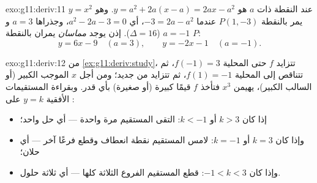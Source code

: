 \begin{solution}{exo:g11:deriv:11}
  $y = x^2$ عند النقطة ذات  $a$ هو
$y = a^2 + 2a(x - a) = 2ax - a^2$. وهو يمر بالنقطة $P(1, -3)$ عندما
$-3 = 2a - a^2$، أي $a^2 - 2a - 3 = 0$، وجذراها $a = 3$ و
$a = -1$ ($\Delta = 16$). إذن يوجد \emph{مماسان} يمران
بالنقطة $P$:
\[
y = 6x - 9 \quad (a = 3),
\qquad
y = -2x - 1 \quad (a = -1).
\]
\end{solution}

\begin{solution}{exo:g11:deriv:12}
من \cref{ex:g11:deriv:study}، تتزايد $f$ حتى  المحلية
$f(-1) = 3$، ثم تتناقص إلى  المحلية $f(1) = -1$، ثم تتزايد
من جديد؛ ومن أجل $x$ الموجب الكبير (أو السالب الكبير)، يهيمن $x^3$ فتأخذ $f$
قيمًا كبيرة (أو صغيرة) بأي قدر. وبقراءة المستقيمات الأفقية
$y = k$ على :
\begin{itemize}
  \item إذا كان $k > 3$ أو $k < -1$: التقى المستقيم  مرة واحدة
        --- أي حل واحد؛
  \item وإذا كان $k = 3$ أو $k = -1$: لامس المستقيم نقطة انعطاف وقطع
        فرعًا آخر --- أي حلان؛
  \item وإذا كان $-1 < k < 3$: قطع المستقيم الفروع الثلاثة كلها --- أي ثلاثة
        حلول.
\end{itemize}
\end{solution}

